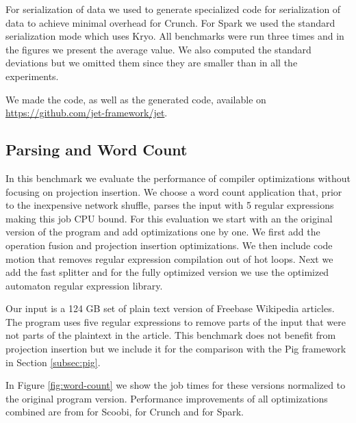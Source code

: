 For serialization of data we used \tool to generate specialized code for
serialization of data to achieve minimal overhead for Crunch. 
For Spark we used the standard serialization mode which uses Kryo. All
benchmarks were run three times and in the figures we present the average
value. We also computed the standard deviations but we omitted them since they
are smaller than  in all the experiments.

We made the \tool code, as well as the generated code, available on
\url{https://github.com/jet-framework/jet}.


\subsection{Parsing and Word Count}
\label{subsec:parsing-word-count}

In this benchmark we evaluate the performance of \tool compiler optimizations
without focusing on projection insertion. We choose a word count application
that, prior to the inexpensive network shuffle, parses the input with 5 regular
expressions making this job CPU bound. For this evaluation we start with an the
original version of the program and add optimizations one by one. We first add
the operation fusion and projection insertion optimizations. We then include
code motion that removes regular expression compilation out of hot loops. Next
we add the fast splitter and for the fully optimized version we use the
optimized automaton regular expression library.

Our input is a 124 GB set of plain text version of Freebase Wikipedia articles.
The program uses five regular expressions to remove parts of the input that were
not parts of the plaintext in the article. This benchmark does not benefit from
projection insertion but we include it for the comparison
with the Pig framework in Section \ref{subsec:pig}.

In Figure \ref{fig:word-count} we show the job times for these versions
normalized to the original program version. Performance improvements of all
optimizations combined are from  for Scoobi,  for Crunch
and  for Spark. 

